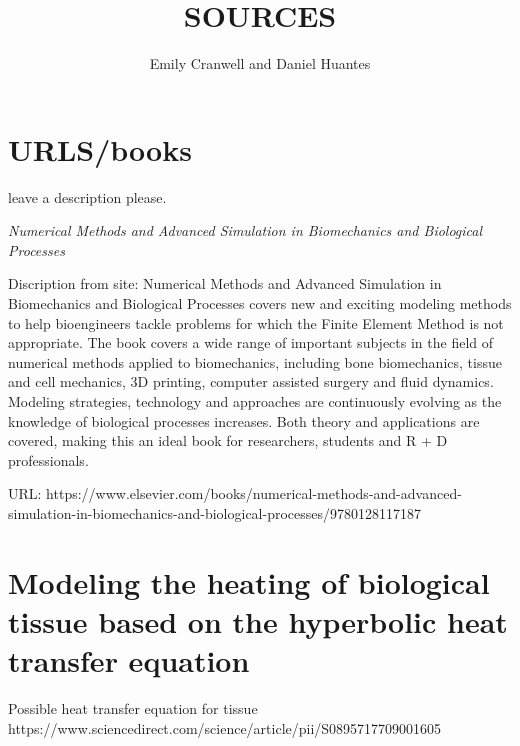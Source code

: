 \documentclass[12pt]{article}
\begin{document}
\title{SOURCES}
\author{Emily Cranwell and Daniel Huantes}
\maketitle
\section{URLS/books}
leave a description please.

\textit{Numerical Methods and Advanced Simulation in Biomechanics and Biological Processes}

Discription from site: Numerical Methods and Advanced Simulation in Biomechanics and Biological Processes covers new and exciting modeling methods to help bioengineers tackle problems for which the Finite Element Method is not appropriate. The book covers a wide range of important subjects in the field of numerical methods applied to biomechanics, including bone biomechanics, tissue and cell mechanics, 3D printing, computer assisted surgery and fluid dynamics. Modeling strategies, technology and approaches are continuously evolving as the knowledge of biological processes increases. Both theory and applications are covered, making this an ideal book for researchers, students and R + D professionals.

URL: https://www.elsevier.com/books/numerical-methods-and-advanced-simulation-in-biomechanics-and-biological-processes/9780128117187
\section{Modeling the heating of biological tissue based on the hyperbolic heat transfer equation}
Possible heat transfer equation for tissue
https://www.sciencedirect.com/science/article/pii/S0895717709001605
\end{document}
